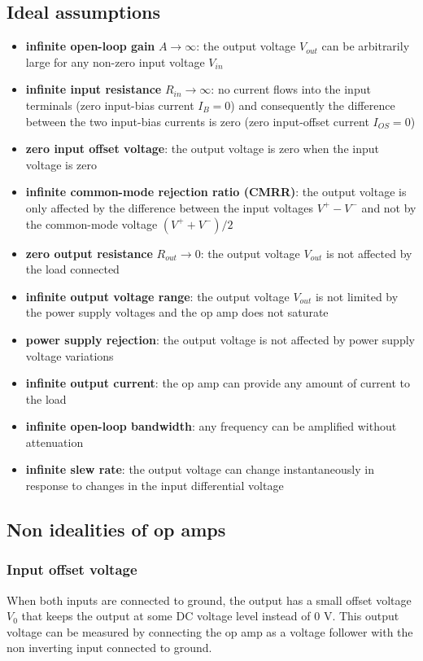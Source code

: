 \subsection{Ideal assumptions}
\begin{itemize}
	\item \textbf{infinite open-loop gain} \(A \to \infty\): the output voltage \(V_{out}\) can be arbitrarily large for any
	non-zero input voltage \(V_{in}\)
	\item \textbf{infinite input resistance} \(R_{in} \to \infty\): no current flows into the input terminals (zero input-bias
	current \(I_B = 0\)) and consequently the difference between the two input-bias currents is zero (zero input-offset current
	\(I_{OS} = 0\))
	\item \textbf{zero input offset voltage}: the output voltage is zero when the input voltage is zero
	\item \textbf{infinite common-mode rejection ratio (CMRR)}: the output voltage is only affected by the difference between
	the input voltages \(V^+ - V^-\) and not by the common-mode voltage \((V^+ + V^-)/2\)
	\item \textbf{zero output resistance} \(R_{out} \to 0\): the output voltage \(V_{out}\) is not affected by the load connected
	\item \textbf{infinite output voltage range}: the output voltage \(V_{out}\) is not limited by the power supply voltages
	and the op amp does not saturate
	\item \textbf{power supply rejection}: the output voltage is not affected by power supply voltage variations
	\item \textbf{infinite output current}: the op amp can provide any amount of current to the load
	\item \textbf{infinite open-loop bandwidth}: any frequency can be amplified without attenuation
	\item \textbf{infinite slew rate}: the output voltage can change instantaneously in response to changes in the input differential voltage
\end{itemize}

\subsection{Non idealities of op amps}
\subsubsection*{Input offset voltage}
When both inputs are connected to ground, the output has a small offset voltage \(V_0\) that keeps the output at some DC voltage
level instead of 0 V. This output voltage can be measured by connecting the op amp as a voltage follower with the non inverting
input connected to ground.

